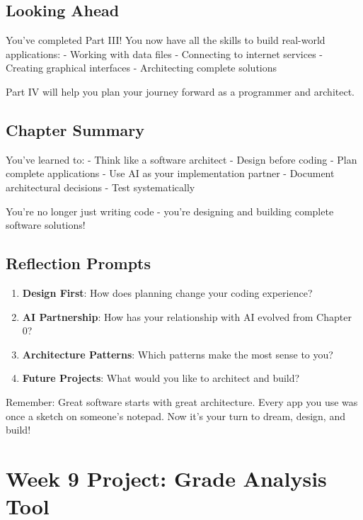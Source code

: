 \documentclass[
  letterpaper,
  DIV=11,
  numbers=noendperiod,
  oneside]{scrreprt}
\providecommand{\tightlist}{%
  \setlength{\itemsep}{0pt}\setlength{\parskip}{0pt}}\usepackage{longtable,booktabs,array}
\begin{document}
\section{Looking Ahead}\label{looking-ahead-3}

You've completed Part III! You now have all the skills to build
real-world applications: - Working with data files - Connecting to
internet services - Creating graphical interfaces - Architecting
complete solutions

Part IV will help you plan your journey forward as a programmer and
architect.

\section{Chapter Summary}\label{chapter-summary-17}

You've learned to: - Think like a software architect - Design before
coding - Plan complete applications - Use AI as your implementation
partner - Document architectural decisions - Test systematically

You're no longer just writing code - you're designing and building
complete software solutions!

\section{Reflection Prompts}\label{reflection-prompts-3}

\begin{enumerate}
\def\labelenumi{\arabic{enumi}.}
\tightlist
\item
  \textbf{Design First}: How does planning change your coding
  experience?
\item
  \textbf{AI Partnership}: How has your relationship with AI evolved
  from Chapter 0?
\item
  \textbf{Architecture Patterns}: Which patterns make the most sense to
  you?
\item
  \textbf{Future Projects}: What would you like to architect and build?
\end{enumerate}

Remember: Great software starts with great architecture. Every app you
use was once a sketch on someone's notepad. Now it's your turn to dream,
design, and build!

\chapter{Week 9 Project: Grade Analysis
Tool}\label{sec-project-grade-analysis}
\end{document}
